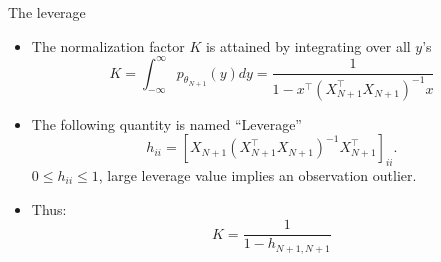 \documentclass[aspectratio=169]{beamer}
\begin{document}
\begin{frame}{The leverage}
\begin{itemize}
\setlength\itemsep{1.0em}
\item The normalization factor $K$ is attained by integrating over all $y$'s
    \begin{equation}
        K 
        = \int_{-\infty}^{\infty} p_{\theta_{N+1}}(y) dy 
        = \frac{1}{1 - x^\top \left( X_{N+1}^\top X_{N+1} \right)^{-1} x }
    \end{equation}
\item The following quantity is named ``Leverage''
    \begin{equation*}
        h_{ii}=\left [ X_{N+1} (X_{N+1}^\top  X_{N+1})^{-1}X_{N+1}^\top \right]_{ii}.
    \end{equation*}
    $0\leq h_{ii} \leq 1$, large leverage value implies an observation outlier.
    \item Thus: \begin{equation} K= \frac{1}{1-h_{N+1,N+1}} \end{equation}
\end{itemize}
\end{frame}
\end{document}
